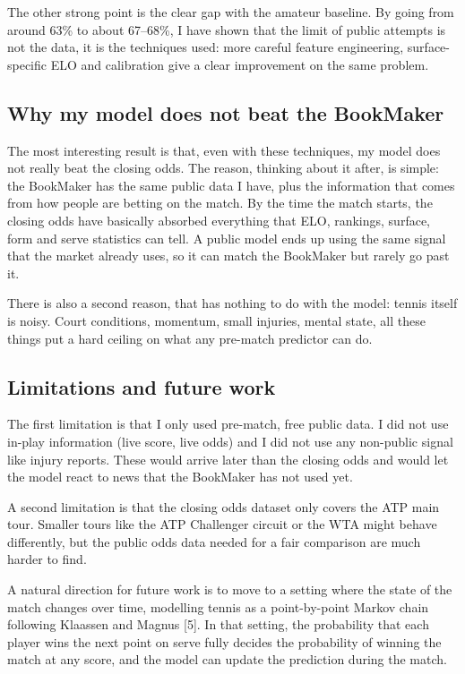 \documentclass[10pt,twocolumn]{article}
\begin{document}
The other strong point is the clear gap with the amateur baseline. By
going from around 63\% to about 67--68\%, I have shown that the limit
of public attempts is not the data, it is the techniques used: more
careful feature engineering, surface-specific ELO and calibration give
a clear improvement on the same problem.

\subsection{Why my model does not beat the BookMaker}
The most interesting result is that, even with these techniques, my
model does not really beat the closing odds. The reason, thinking
about it after, is simple: the BookMaker has the same public data I
have, plus the information that comes from how people are betting on
the match. By the time the match starts, the closing odds have
basically absorbed everything that ELO, rankings, surface, form and
serve statistics can tell. A public model ends up using the same
signal that the market already uses, so it can match the BookMaker
but rarely go past it.

There is also a second reason, that has nothing to do with the model:
tennis itself is noisy. Court conditions, momentum, small injuries,
mental state, all these things put a hard ceiling on what any
pre-match predictor can do.

\subsection{Limitations and future work}
The first limitation is that I only used pre-match, free public data.
I did not use in-play information (live score, live odds) and I did
not use any non-public signal like injury reports. These would arrive
later than the closing odds and would let the model react to news
that the BookMaker has not used yet.

A second limitation is that the closing odds dataset only covers the
ATP main tour. Smaller tours like the ATP Challenger circuit or the
WTA might behave differently, but the public odds data needed for a
fair comparison are much harder to find.

A natural direction for future work is to move to a setting where the
state of the match changes over time, modelling tennis as a
point-by-point Markov chain following Klaassen and Magnus [5]. In
that setting, the probability that each player wins the next point on
serve fully decides the probability of winning the match at any
score, and the model can update the prediction during the match.
\end{document}

